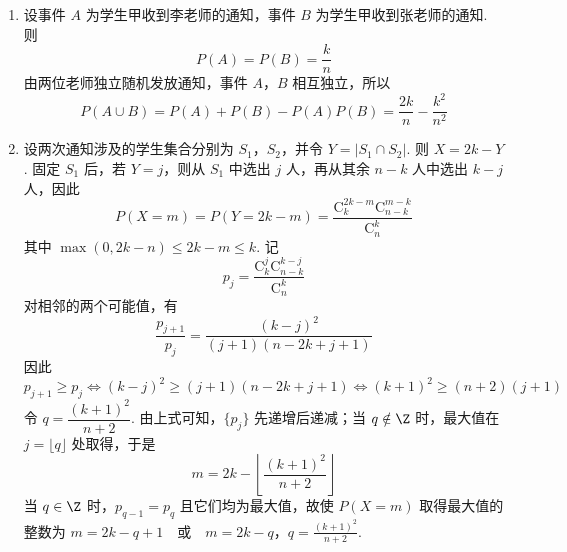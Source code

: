 \begin{solution}
\begin{enumerate}
\item 设事件 \(A\) 为学生甲收到李老师的通知，事件 \(B\) 为学生甲收到张老师的通知. 则
\[
P(A)=P(B)=\frac{k}{n}
\]
由两位老师独立随机发放通知，事件 \(A\)，\(B\) 相互独立，所以
\[
P(A\cup B)=P(A)+P(B)-P(A)P(B)
=\frac{2k}{n}-\frac{k^2}{n^2}
\]

\item 设两次通知涉及的学生集合分别为 \(S_1\)，\(S_2\)，并令 \(Y=|S_1\cap S_2|\). 则 \(X=2k-Y\). 固定 \(S_1\) 后，若 \(Y=j\)，则从 \(S_1\) 中选出 \(j\) 人，再从其余 \(n-k\) 人中选出 \(k-j\) 人，因此
\[
P(X=m)=P(Y=2k-m)=\frac{\mathrm C_k^{2k-m}\mathrm C_{n-k}^{m-k}}{\mathrm C_n^k}
\]
其中 \(\max(0,2k-n)\leqslant2k-m\leqslant k\). 记
\[
p_j=\frac{\mathrm C_k^j\mathrm C_{n-k}^{k-j}}{\mathrm C_n^k}
\]
对相邻的两个可能值，有
\[
\frac{p_{j+1}}{p_j}=\frac{(k-j)^2}{(j+1)(n-2k+j+1)}
\]
因此
\[
p_{j+1}\geqslant p_j
\Longleftrightarrow
(k-j)^2\geqslant(j+1)(n-2k+j+1)
\Longleftrightarrow
(k+1)^2\geqslant(n+2)(j+1)
\]
令 \(q=\dfrac{(k+1)^2}{n+2}\). 由上式可知，\(\{p_j\}\) 先递增后递减；当 \(q\notin\Z\) 时，最大值在 \(j=\lfloor q\rfloor\) 处取得，于是
\[
m=2k-\left\lfloor\frac{(k+1)^2}{n+2}\right\rfloor
\]
当 \(q\in\Z\) 时，\(p_{q-1}=p_q\) 且它们均为最大值，故使 \(P(X=m)\) 取得最大值的整数为
\(m=2k-q+1\quad\text{或}\quad m=2k-q\)，\(q=\frac{(k+1)^2}{n+2}\).
\end{enumerate}
\end{solution}
